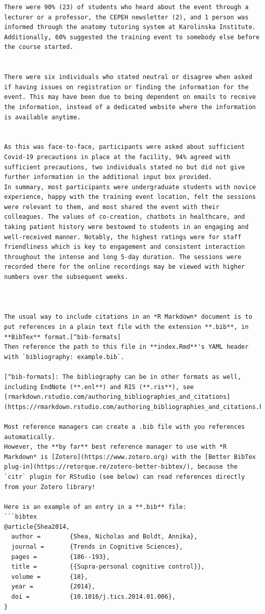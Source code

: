 \documentclass[a4paper, nobind]{templates/ociamthesis}
\begin{document}
\begin{verbatim}
There were 90% (23) of students who heard about the event through a lecturer or a professor, the CEPEH newsletter (2), and 1 person was informed through the anatomy tutoring system at Karolinska Institute. Additionally, 60% suggested the training event to somebody else before the course started.


There were six individuals who stated neutral or disagree when asked if having issues on registration or finding the information for the event. This may have been due to being dependent on emails to receive the information, instead of a dedicated website where the information is available anytime. 


As this was face-to-face, participants were asked about sufficient Covid-19 precautions in place at the facility, 94% agreed with sufficient precautions, two individuals stated no but did not give further information in the additional input box provided.
In summary, most participants were undergraduate students with novice experience, happy with the training event location, felt the sessions were relevant to them, and most shared the event with their colleagues. The values of co-creation, chatbots in healthcare, and taking patient history were bestowed to students in an engaging and well-received manner. Notably, the highest ratings were for staff friendliness which is key to engagement and consistent interaction throughout the intense and long 5-day duration. The sessions were recorded there for the online recordings may be viewed with higher numbers over the subsequent weeks. 



The usual way to include citations in an *R Markdown* document is to put references in a plain text file with the extension **.bib**, in **BibTex** format.[^bib-formats]
Then reference the path to this file in **index.Rmd**'s YAML header with `bibliography: example.bib`.

[^bib-formats]: The bibliography can be in other formats as well, including EndNote (**.enl**) and RIS (**.ris**), see [rmarkdown.rstudio.com/authoring_bibliographies_and_citations](https://rmarkdown.rstudio.com/authoring_bibliographies_and_citations.html).

Most reference managers can create a .bib file with you references automatically.
However, the **by far** best reference manager to use with *R Markdown* is [Zotero](https://www.zotero.org) with the [Better BibTex plug-in](https://retorque.re/zotero-better-bibtex/), because the `citr` plugin for RStudio (see below) can read references directly from your Zotero library!

Here is an example of an entry in a **.bib** file:
```bibtex
@article{Shea2014,
  author =        {Shea, Nicholas and Boldt, Annika},
  journal =       {Trends in Cognitive Sciences},
  pages =         {186--193},
  title =         {{Supra-personal cognitive control}},
  volume =        {18},
  year =          {2014},
  doi =           {10.1016/j.tics.2014.01.006},
}
\end{verbatim}
\end{document}

